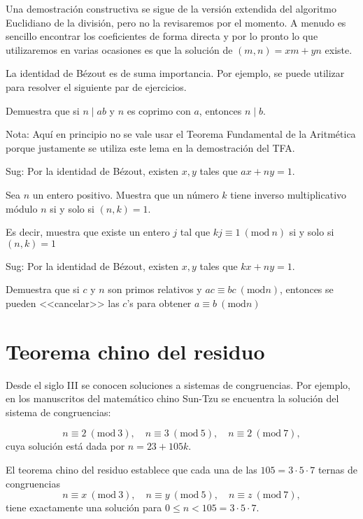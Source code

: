 Una demostración constructiva se sigue de la versión extendida del algoritmo Euclidiano de la división, pero no la revisaremos por el momento. A menudo es sencillo encontrar los coeficientes de forma directa y por lo pronto lo que utilizaremos en varias ocasiones es que la solución de $(m,n)=xm+yn$ existe.

La identidad de Bézout es de suma importancia. Por ejemplo, se puede utilizar para resolver el siguiente par de ejercicios. 

\begin{ejercicio}
Demuestra que si $n\mid ab$ y $n$ es coprimo con $a$, entonces $n\mid b$. 

Nota: Aquí en principio no se vale usar el Teorema Fundamental de la Aritmética porque justamente se utiliza este lema en la demostración del TFA.  
\end{ejercicio}
Sug: Por la identidad de Bézout, existen $x,y$ tales que $ax+ny=1$.

\begin{ejercicio}
Sea $n$ un entero positivo. Muestra que un número $k$ tiene inverso multiplicativo módulo $n$ si y solo si $(n,k)=1$. 

Es decir, muestra que existe un entero $j$ tal que $kj\equiv 1 ~(\mathrm {mod}~n)$ si y solo si $(n,k)=1$
\end{ejercicio}
Sug: Por la identidad de Bézout, existen $x,y$ tales que $kx+ny=1$.

\begin{ejercicio}
Demuestra que si $c$ y $n$ son primos relativos y $ac\equiv bc ~(\mathrm {mod} n)$, entonces se pueden <<cancelar>> las $c$'s para obtener $a\equiv b ~(\mathrm {mod} n)$
\end{ejercicio}


\section{Teorema chino del residuo}

Desde el siglo III se conocen soluciones a sistemas de congruencias. Por ejemplo, en los manuscritos del matemático chino Sun-Tzu se encuentra la solución  del sistema de congruencias:

$$n\equiv 2 ~(\mathrm {mod}~3), \quad n\equiv 3 ~(\mathrm {mod}~5), \quad n\equiv 2 ~(\mathrm {mod}~7),$$
cuya solución está dada por $n=23+105k$.

El teorema chino del residuo establece que cada una de las $105=3\cdot 5\cdot 7$ ternas de congruencias
$$n\equiv x ~(\mathrm {mod}~3), \quad n\equiv y ~(\mathrm {mod}~5), \quad n\equiv z ~(\mathrm {mod}~7),$$
tiene exactamente una solución para $0\leq n < 105=3\cdot 5\cdot 7$.

